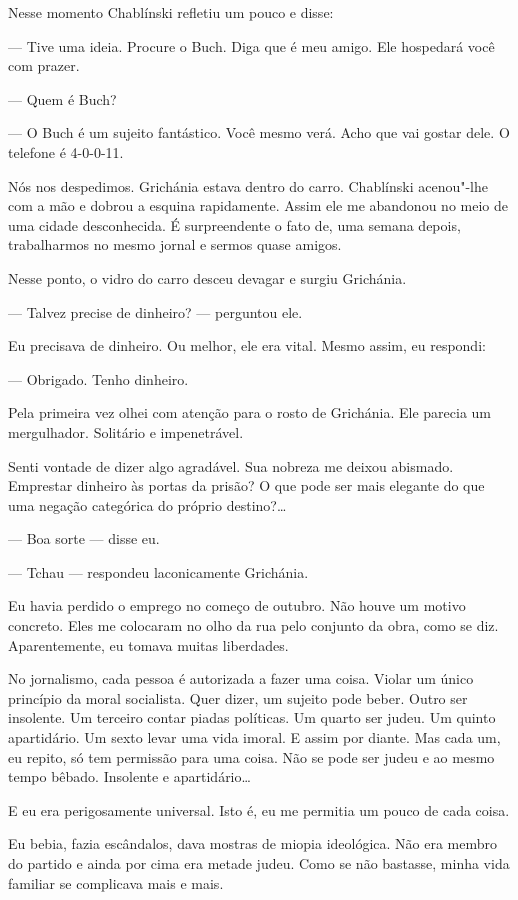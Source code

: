Nesse momento Chablínski refletiu um pouco e disse:

--- Tive uma ideia. Procure o Buch. Diga que é meu amigo. Ele hospedará
você com prazer.

--- Quem é Buch?

--- O Buch é um sujeito fantástico. Você mesmo verá. Acho que vai gostar
dele. O telefone é 4-0-0-11.

Nós nos despedimos. Grichánia estava dentro do carro. Chablínski
acenou"-lhe com a mão e dobrou a esquina rapidamente. Assim ele me
abandonou no meio de uma cidade desconhecida. É surpreendente o fato de,
uma semana depois, trabalharmos no mesmo jornal e sermos quase amigos.

Nesse ponto, o vidro do carro desceu devagar e surgiu Grichánia.

--- Talvez precise de dinheiro? --- perguntou ele.

Eu precisava de dinheiro. Ou melhor, ele era vital. Mesmo assim, eu
respondi:

--- Obrigado. Tenho dinheiro.

Pela primeira vez olhei com atenção para o rosto de Grichánia. Ele
parecia um mergulhador. Solitário e impenetrável.

Senti vontade de dizer algo agradável. Sua nobreza me deixou abismado.
Emprestar dinheiro às portas da prisão? O que pode ser mais elegante do
que uma negação categórica do próprio destino?\ldots{}

--- Boa sorte --- disse eu.

--- Tchau --- respondeu laconicamente Grichánia.

Eu havia perdido o emprego no começo de outubro. Não houve um motivo
concreto. Eles me colocaram no olho da rua pelo conjunto da obra, como
se diz. Aparentemente, eu tomava muitas liberdades.

No jornalismo, cada pessoa é autorizada a fazer uma coisa. Violar um \label{ref2}
único princípio da moral socialista. Quer dizer, um sujeito pode beber.
Outro ser insolente. Um terceiro contar piadas políticas. Um quarto ser
judeu. Um quinto apartidário. Um sexto levar uma vida imoral. E assim
por diante. Mas cada um, eu repito, só tem permissão para uma coisa. Não
se pode ser judeu e ao mesmo tempo bêbado. Insolente e apartidário\ldots{}

E eu era perigosamente universal. Isto é, eu me permitia um pouco de
cada coisa.

Eu bebia, fazia escândalos, dava mostras de miopia ideológica. Não era
membro do partido e ainda por cima era metade judeu. Como se não
bastasse, minha vida familiar se complicava mais e mais.

